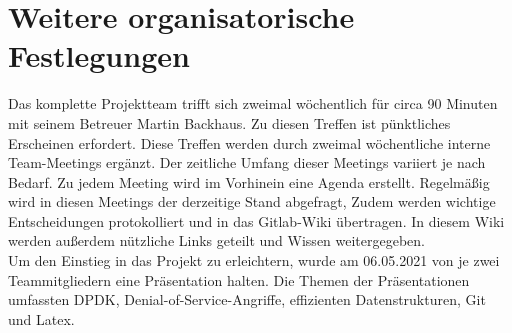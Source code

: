 \documentclass[../review_1.tex]{subfiles}
\begin{document}
\section{Weitere organisatorische Festlegungen}
Das komplette Projektteam trifft sich zweimal wöchentlich für circa 90 Minuten mit seinem Betreuer Martin Backhaus. Zu diesen Treffen ist pünktliches Erscheinen erfordert. Diese Treffen werden durch zweimal wöchentliche interne Team-Meetings ergänzt. Der zeitliche Umfang dieser Meetings variiert je nach Bedarf. Zu jedem Meeting wird im Vorhinein eine Agenda erstellt. Regelmäßig wird in diesen Meetings der derzeitige Stand abgefragt, Zudem werden wichtige Entscheidungen protokolliert und in das Gitlab-Wiki übertragen. In diesem Wiki werden außerdem nützliche Links geteilt und Wissen weitergegeben.\\
Um den Einstieg in das Projekt zu erleichtern, wurde am 06.05.2021 von je zwei Teammitgliedern eine Präsentation halten. Die Themen der Präsentationen umfassten DPDK, Denial-of-Service-Angriffe, effizienten Datenstrukturen, Git und Latex.
\end{document}
